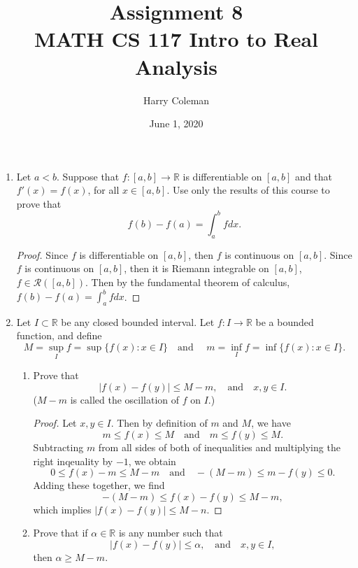 \documentclass[12pt]{article}
\newcommand{\R}{\mathbb{R}}
\newcommand{\RR}{\mathcal{R}}
\newcommand{\isp}[1]{\quad\text{#1}\quad}
\begin{document}
 
\title{Assignment 8\\
    \large MATH CS 117 Intro to Real Analysis}
\author{Harry Coleman}
\date{June 1, 2020}
\maketitle

\begin{enumerate}

\item
Let $a<b$.  Suppose that $f:[a,b]\to\R$ is differentiable on $[a,b]$ and
that $f'(x)=f(x)$, for all $x\in[a,b]$.  Use only the results of this course to prove that
\[f(b)-f(a)=\int_a^bfdx.\]

\begin{proof}
    Since $f$ is differentiable on $[a,b]$, then $f$ is continuous on $[a,b]$. Since $f$ is continuous on $[a,b]$, then it is Riemann integrable on $[a,b]$, $f\in\RR([a,b])$. Then by the fundamental theorem of calculus, $f(b)-f(a)=\int_a^bfdx$.
    
\end{proof}


\item
Let  $I\subset\R$ be any closed bounded interval.  Let $f:I\to\R$ be a bounded function, and define 
\[M=\sup\limits_I f=\sup\{f(x):x\in I\}\isp{and } m=\inf\limits_I f=\inf \{f(x):x\in I\}.\]

\begin{enumerate}

\item
Prove that
\[|f(x)-f(y)|\le M-m,\isp{and} x,y\in I.\]
($M-m$ is called the oscillation of $f$ on $I$.)

\begin{proof}
    Let $x,y\in I$. Then by definition of $m$ and $M$, we have 
    \[m\leq f(x) \leq M \isp{and} m\leq f(y) \leq M.\]
    Subtracting $m$ from all sides of both of inequalities and multiplying the right inqeuality by $-1$, we obtain
    \[0\leq f(x)-m \leq M-m \isp{and} -(M-m)\leq m-f(y) \leq 0.\]
    Adding these together, we find
    \[-(M-m) \leq f(x)-f(y) \leq M-m,\]
    which implies $|f(x)-f(y)|\leq M-n$.
    
\end{proof}

\item
Prove that if  $\alpha\in\R$ is any number such that
\[|f(x)-f(y)|\le \alpha ,\isp{and} x,y\in I,\]
then $\alpha\ge M-m$.


\end{enumerate}
\end{enumerate}
\end{document}
